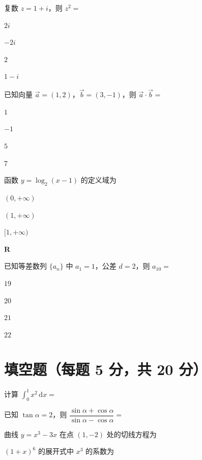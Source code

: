\documentclass{exam-zh}
\begin{document}
\begin{question}
复数 $z=1+i$，则 $z^2=$ \paren
\begin{choices}
\item $2i$
\item $-2i$
\item $2$
\item $1-i$
\end{choices}
\end{question}
\begin{question}
已知向量 $\vec a=(1,2)$，$\vec b=(3,-1)$，则 $\vec a\cdot\vec b=$ \paren
\begin{choices}
\item $1$
\item $-1$
\item $5$
\item $7$
\end{choices}
\end{question}
\begin{question}
函数 $y=\log_2(x-1)$ 的定义域为 \paren
\begin{choices}
\item $(0,+\infty)$
\item $(1,+\infty)$
\item $[1,+\infty)$
\item $\mathbf{R}$
\end{choices}
\end{question}
\begin{question}
已知等差数列 $\{a_n\}$ 中 $a_1=1$，公差 $d=2$，则 $a_{10}=$ \paren
\begin{choices}
\item $19$
\item $20$
\item $21$
\item $22$
\end{choices}
\end{question}

\section{填空题（每题 5 分，共 20 分）}
\begin{question}
计算 $\displaystyle\int_0^1 x^2\,\mathrm{d}x=$ \fillin[$\dfrac{1}{3}$]
\end{question}
\begin{question}
已知 $\tan\alpha=2$，则 $\dfrac{\sin\alpha+\cos\alpha}{\sin\alpha-\cos\alpha}=$ \fillin[$3$]
\end{question}
\begin{question}
曲线 $y=x^3-3x$ 在点 $(1,-2)$ 处的切线方程为 \fillin[$y=-2$]
\end{question}
\begin{question}
$(1+x)^6$ 的展开式中 $x^3$ 的系数为 \fillin[$20$]
\end{question}
\end{document}

